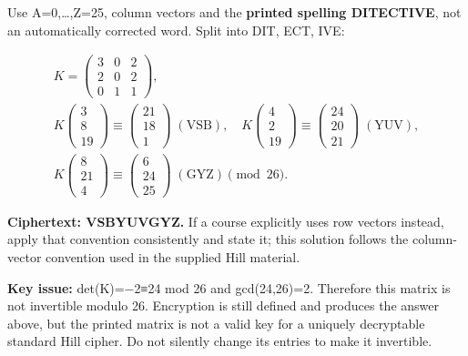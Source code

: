 \documentclass[11pt,a4paper]{article}
\begin{document}
Use A=\allowbreak{}0,\allowbreak{}…,\allowbreak{}Z=\allowbreak{}25,\allowbreak{} column vectors and the \textbf{printed spelling DITECTIVE},\allowbreak{} not an automatically corrected word. Split into DIT,\allowbreak{} ECT,\allowbreak{} IVE:



\[
\begin{gathered}K=\begin{pmatrix}3&0&2\\2&0&2\\0&1&1\end{pmatrix},\\[4pt]K\begin{pmatrix}3\\8\\19\end{pmatrix}\equiv\begin{pmatrix}21\\18\\1\end{pmatrix}\;(\mathrm{VSB}),\quad K\begin{pmatrix}4\\2\\19\end{pmatrix}\equiv\begin{pmatrix}24\\20\\21\end{pmatrix}\;(\mathrm{YUV}),\\[4pt]K\begin{pmatrix}8\\21\\4\end{pmatrix}\equiv\begin{pmatrix}6\\24\\25\end{pmatrix}\;(\mathrm{GYZ})\pmod{26}.\end{gathered}
\]

\textbf{Ciphertext: VSBYUVGYZ.} If a course explicitly uses row vectors instead,\allowbreak{} apply that convention consistently and state it; this solution follows the column-vector convention used in the supplied Hill material.


\textbf{Key issue:} det(K)=\allowbreak{}−2≡24 mod 26 and gcd(24,\allowbreak{}26)=\allowbreak{}2. Therefore this matrix is not invertible modulo 26. Encryption is still defined and produces the answer above,\allowbreak{} but the printed matrix is not a valid key for a uniquely decryptable standard Hill cipher. Do not silently change its entries to make it invertible.
\end{document}
